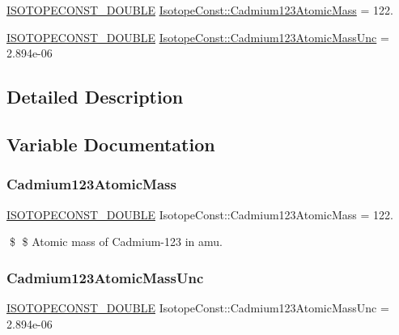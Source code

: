 \begin{DoxyCompactItemize}
\item 
\mbox{\hyperlink{group___isotope_const-_macros_ga8f45a7272ce02c0b4c65c44636ed719a}{I\+S\+O\+T\+O\+P\+E\+C\+O\+N\+S\+T\+\_\+\+D\+O\+U\+B\+LE}} \mbox{\hyperlink{group___isotope_const-_cadmium-_cd123_ga59988d5ac5d64f95727052b6fbe3eae9}{Isotope\+Const\+::\+Cadmium123\+Atomic\+Mass}} = 122.
\item 
\mbox{\hyperlink{group___isotope_const-_macros_ga8f45a7272ce02c0b4c65c44636ed719a}{I\+S\+O\+T\+O\+P\+E\+C\+O\+N\+S\+T\+\_\+\+D\+O\+U\+B\+LE}} \mbox{\hyperlink{group___isotope_const-_cadmium-_cd123_gacd102f996cee9c6d3c0b5e1c7620d747}{Isotope\+Const\+::\+Cadmium123\+Atomic\+Mass\+Unc}} = 2.\+894e-\/06
\end{DoxyCompactItemize}


\subsection{Detailed Description}


\subsection{Variable Documentation}
\mbox{\label{group___isotope_const-_cadmium-_cd123_ga59988d5ac5d64f95727052b6fbe3eae9}} 
\subsubsection{\texorpdfstring{Cadmium123\+Atomic\+Mass}{Cadmium123AtomicMass}}
{\footnotesize\ttfamily \mbox{\hyperlink{group___isotope_const-_macros_ga8f45a7272ce02c0b4c65c44636ed719a}{I\+S\+O\+T\+O\+P\+E\+C\+O\+N\+S\+T\+\_\+\+D\+O\+U\+B\+LE}} Isotope\+Const\+::\+Cadmium123\+Atomic\+Mass = 122.}

\$ \$ Atomic mass of Cadmium-\/123 in amu. \mbox{\label{group___isotope_const-_cadmium-_cd123_gacd102f996cee9c6d3c0b5e1c7620d747}} 
\subsubsection{\texorpdfstring{Cadmium123\+Atomic\+Mass\+Unc}{Cadmium123AtomicMassUnc}}
{\footnotesize\ttfamily \mbox{\hyperlink{group___isotope_const-_macros_ga8f45a7272ce02c0b4c65c44636ed719a}{I\+S\+O\+T\+O\+P\+E\+C\+O\+N\+S\+T\+\_\+\+D\+O\+U\+B\+LE}} Isotope\+Const\+::\+Cadmium123\+Atomic\+Mass\+Unc = 2.\+894e-\/06}

